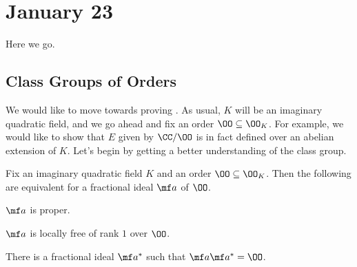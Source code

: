 \documentclass[../notes.tex]{subfiles}
\begin{document}
\section{January 23}

Here we go.

\subsection{Class Groups of Orders}
We would like to move towards proving . As usual, $K$ will be an imaginary quadratic field, and we go ahead and fix an order $\OO\subseteq\OO_K$. For example, we would like to show that $E$ given by $\CC/\OO$ is in fact defined over an abelian extension of $K$. Let's begin by getting a better understanding of the class group.
\begin{lemma} \label{lem:proper-ideal-order}
	Fix an imaginary quadratic field $K$ and an order $\OO\subseteq\OO_K$. Then the following are equivalent for a fractional ideal $\mf a$ of $\OO$.
	\begin{listalph}
		\item $\mf a$ is proper.
		\item $\mf a$ is locally free of rank $1$ over $\OO$.
		\item There is a fractional ideal $\mf a^*$ such that $\mf a\mf a^*=\OO$.
	\end{listalph}
\end{lemma}
\end{document}
